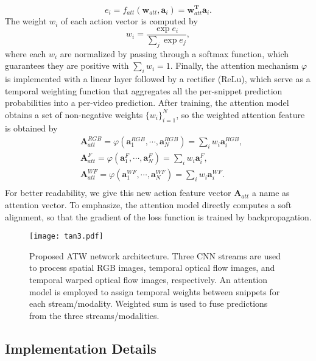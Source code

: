 \documentclass[runningheads,a4paper]{llncs}
\begin{document}
\begin{equation}
e_i = f_{att}(\mathbf{w}_{att},\mathbf{a}_i) = \mathbf{w}_{att}^\mathbf{T}\mathbf{a}_i.
\end{equation}
The weight $w_i$ of each action vector is computed by
\begin{equation}
w_i =  \frac{\exp{e_i}}{\sum_j\exp{e_j}},
\end{equation}
where each $w_i$ are normalized by passing through a softmax function, which guarantees
they are positive with $\sum_i{w_i}=1$.
Finally, the attention mechanism $\varphi$ is implemented with a linear layer followed by a rectifier (ReLu), which serve as a
temporal weighting function that aggregates all the per-snippet prediction probabilities into a per-video prediction.
After training, the attention model obtains a set of non-negative weights $\{w_i\}^N_{i=1}$, so the weighted attention
feature is obtained by
\begin{equation}
\begin{split}
&\mathbf{A}_{att}^{RGB} = \varphi(\mathbf{a}_1^{RGB}, \cdots, \mathbf{a}_N^{RGB}) =
\sum_{i} w_i{\mathbf{a}_i^{RGB}}, \\
&\mathbf{A}_{att}^{F} = \varphi(\mathbf{a}_1^{F}, \cdots, \mathbf{a}_N^{F}) =
\sum_{i} w_i{\mathbf{a}_i^{F}}, \\
&\mathbf{A}_{att}^{WF} = \varphi(\mathbf{a}_1^{WF}, \cdots, \mathbf{a}_N^{WF}) =
\sum_{i} w_i{\mathbf{a}_i^{WF}}. \\
\end{split}
\end{equation}
For better readability, we give this new action feature vector $\mathbf{A}_{att}$ a name as
attention vector. To emphasize, the attention model directly computes a soft alignment, so that the gradient
of the loss function is trained by backpropagation.

\begin{figure}[t]
\centering
\texttt{[image: tan3.pdf]}
\caption{Proposed ATW network architecture. Three CNN streams are used to process spatial RGB images,
temporal optical flow images, and temporal warped optical flow images, respectively. An attention model
is employed to assign temporal weights between snippets for each stream/modality. Weighted sum is used
to fuse predictions from the three streams/modalities.}
\label{fig:tan}
\end{figure}
%
%
\subsection{Implementation Details}
\end{document}
